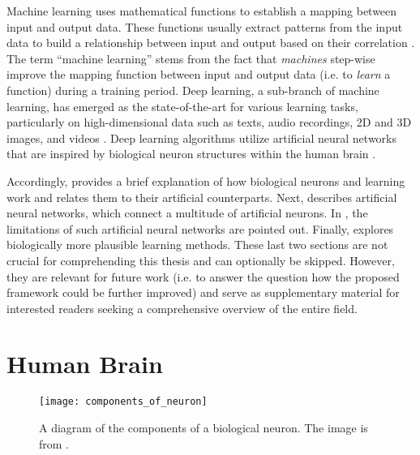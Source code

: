 Machine learning uses mathematical functions to establish a mapping between input and output data.
These functions usually extract patterns from the input data to build a relationship between input and output based on their correlation \cite{mitchell_machine_1997}.
The term ``machine learning'' stems from the fact that \emph{machines} step-wise improve the mapping function between input and output data (i.e. to \emph{learn} a function) during a training period.
Deep learning, a sub-branch of machine learning, has emerged as the state-of-the-art for various learning tasks, particularly on high-dimensional data such as texts, audio recordings, 2D and 3D images, and videos \cite{lecun_deep_2015}.
Deep learning algorithms utilize artificial neural networks that are inspired by biological neuron structures within the human brain \cite{bain_mind_1873, james_principles_1890}.

Accordingly,  provides a brief explanation of how biological neurons and learning work and relates them to their artificial counterparts.
Next,  describes artificial neural networks, which connect a multitude of artificial neurons.
In , the limitations of such artificial neural networks are pointed out.
Finally,  explores biologically more plausible learning methods.
These last two sections are not crucial for comprehending this thesis and can optionally be skipped. However, they are relevant for future work (i.e. to answer the question how the proposed framework could be further improved) and serve as supplementary material for interested readers seeking a comprehensive overview of the entire field.

\section{Human Brain}
\begin{figure}[h]
    \centering
    \texttt{[image: components\_of\_neuron]}
    \caption[Diagram of the components of a biological neuron]{A diagram of the components of a biological neuron. The image is from .}
\end{figure}

